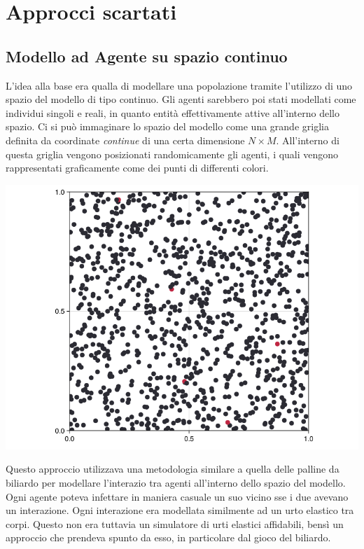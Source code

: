 \section{Approcci scartati}

\subsection{Modello ad Agente su spazio continuo}
L'idea alla base era qualla di modellare una popolazione tramite l'utilizzo di 
uno spazio del modello di tipo continuo. Gli agenti sarebbero poi stati modellati come 
individui singoli e reali, in quanto entità effettivamente attive all'interno 
dello spazio. Ci si può immaginare lo spazio del modello come una grande griglia 
definita da coordinate \emph{continue} di una certa dimensione \emph{$N \times M$}. All'interno 
di questa griglia vengono posizionati randomicamente gli agenti, i quali vengono 
rappresentati graficamente come dei punti di differenti colori.

\begin{minipage}{\linewidth}
    \centering
    \includegraphics[width=\textwidth]{img/ball-covid.png}
    \label{fig:ball_covid}
\end{minipage}

Questo approccio utilizzava una metodologia similare a quella delle palline da biliardo 
per modellare l'interazio tra agenti all'interno dello spazio del modello. Ogni agente poteva
infettare in maniera casuale un suo vicino sse i due avevano un interazione. Ogni interazione
era modellata similmente ad un urto elastico tra corpi. 
Questo non era tuttavia un simulatore di urti elastici affidabili, bensì un approccio che prendeva
spunto da esso, in particolare dal gioco del biliardo. 

